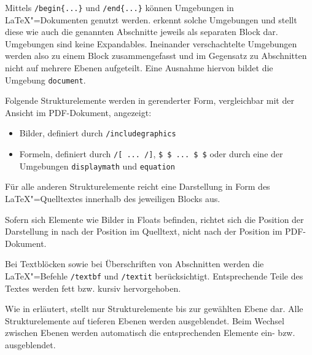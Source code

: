 \clearpage


Mittels \verb|/begin{...}| und \verb|/end{...}| können Umgebungen in \LaTeX"=Dokumenten genutzt werden.
\texla{} erkennt solche Umgebungen und stellt diese wie auch die genannten Abschnitte jeweils als separaten Block dar.
Umgebungen sind keine Expandables.
Ineinander verschachtelte Umgebungen werden also zu einem Block zusammengefasst und im Gegensatz zu Abschnitten nicht
auf mehrere Ebenen aufgeteilt.
Eine Ausnahme hiervon bildet die Umgebung \verb|document|.


Folgende Strukturelemente werden in gerenderter Form, vergleichbar mit der Ansicht im PDF-Dokument, angezeigt:

\begin{itemize}
  \item Bilder, definiert durch \verb|/includegraphics|
  \item Formeln, definiert durch \verb|/[ ... /]|, \verb|$ $ ... $ $| oder durch eine der Umgebungen \verb|displaymath|
  und \verb|equation|
\end{itemize}

Für alle anderen Strukturelemente reicht eine Darstellung in Form des \LaTeX"=Quelltextes innerhalb des jeweiligen
Blocks aus.

Sofern sich Elemente wie Bilder in Floats befinden, richtet sich die Position der Darstellung in \texla{} nach der
Position im Quelltext, nicht nach der Position im PDF-Dokument.


Bei Textblöcken sowie bei Überschriften von Abschnitten werden die \LaTeX"=Befehle \verb|/textbf| und \verb|/textit|
berücksichtigt.
Entsprechende Teile des Textes werden fett bzw. kursiv hervorgehoben.


Wie in  erläutert, stellt \texla{} nur Strukturelemente bis zur gewählten Ebene dar.
Alle Strukturelemente auf tieferen Ebenen werden ausgeblendet.
Beim Wechsel zwischen Ebenen werden automatisch die entsprechenden Elemente ein- bzw. ausgeblendet.

